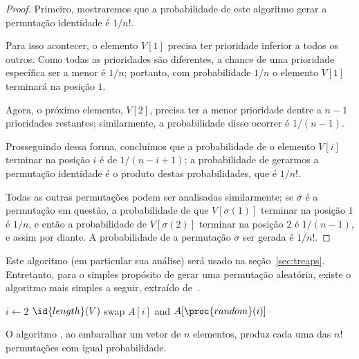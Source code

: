 \begin{proof}
    Primeiro, mostraremos que a probabilidade de este algoritmo
    gerar a permutação identidade é $1/n!$.

    Para isso acontecer,
    o elemento $V[1]$ precisa ter prioridade inferior a todos os outros.
    Como todas as prioridades são diferentes,
    a chance de uma prioridade específica ser a menor é $1/n$;
    portanto, com probabilidade $1/n$ o elemento $V[1]$ terminará na posição $1$.

    Agora, o próximo elemento, $V[2]$,
    precisa ter a menor prioridade dentre a $n-1$ prioridades restantes;
    similarmente, a probabilidade disso ocorrer é $1/(n-1)$.

    Prosseguindo dessa forma,
    concluímos que a probabilidade de o elemento $V[i]$ terminar na posição $i$
    é de $1/(n-i+1)$;
    a probabilidade de gerarmos a permutação identidade
    é o produto destas probabilidades, que é $1/n!$.

    Todas as outras permutações podem ser analisadas similarmente;
    se $\sigma$ é a permutação em questão,
    a probabilidade de que $V[\sigma(1)]$ terminar na posição $1$ é $1/n$,
    e então a probabilidade de $V[\sigma(2)]$ terminar na posição $2$ é $1/(n-1)$,
    e assim por diante.
    A probabilidade de a permutação $\sigma$ ser gerada é $1/n!$.
\end{proof}

Este algoritmo
(em particular sua análise)
será usado na seção~\ref{sec:treaps}.
Entretanto, para o simples propósito de gerar uma permutação aleatória,
existe o algoritmo mais simples a seguir,
extraído de~\cite[p.~357]{SedgewickFlajolet2013}.

\begin{codebox}
    \li \For $i \gets 2$ \To $\id{length}(V)$
    \li \Do
            swap $A[i]$ and $A[\proc{random}(i)]$
    \End
\end{codebox}

\begin{proposition}
    O algoritmo ,
    ao embaralhar um vetor de $n$ elementos,
    produz cada uma das $n!$ permutações
    com igual probabilidade.
\end{proposition}

